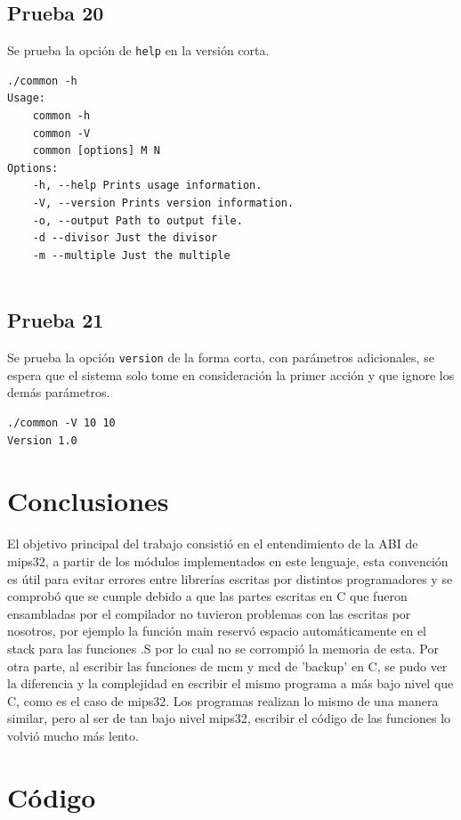\documentclass[titlepage,a4paper]{article}
\begin{document}
\subsection{Prueba 20}
Se prueba la opción de \verb|help| en la versión corta.
\begin{lstlisting}[style=test_run_style]
./common -h
Usage:
	common -h
	common -V
	common [options] M N
Options:
	-h, --help Prints usage information.
	-V, --version Prints version information.
	-o, --output Path to output file.
	-d --divisor Just the divisor
	-m --multiple Just the multiple


\end{lstlisting}
\subsection{Prueba 21}
Se prueba la opción \verb|version| de la forma corta, con parámetros adicionales, se espera que el sistema solo tome en consideración la primer acción y que ignore los demás parámetros. 
\begin{lstlisting}[style=test_run_style]
./common -V 10 10
Version 1.0

\end{lstlisting}

\section{Conclusiones}
El objetivo principal del trabajo consistió en el entendimiento de la ABI de mips32, a partir de los módulos implementados en este lenguaje, esta convención es útil para evitar errores entre librerías escritas por distintos programadores y se comprobó que se cumple debido a que las partes escritas en C que fueron ensambladas por el compilador no tuvieron problemas con las escritas por nosotros, por ejemplo la función main reservó espacio automáticamente en el stack para las funciones .S por lo cual no se corrompió la memoria de esta. \newline
Por otra parte, al escribir las funciones de mcm y mcd de 'backup' en C, se pudo ver la diferencia y la complejidad en escribir el mismo programa a más bajo nivel que C, como es el caso de mips32. Los programas realizan lo mismo de una manera similar, pero al ser de tan bajo nivel mips32, escribir el código de las funciones lo volvió mucho más lento.


\newpage
\appendix
\section{Código}
\end{document}
